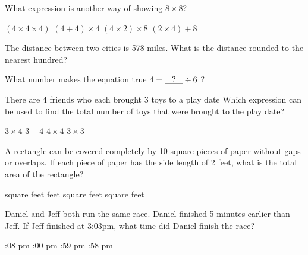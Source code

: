 \documentclass{exam}
\newcommand{\qm}{\underline{\hspace{0.3cm}?\hspace{0.3cm}}}
\begin{document}
\begin{center}
\end{center}

\vspace{0.1in}

\begin{questions}
	\question What expression is another way of showing $8 \times 8$?
	\begin{choices}
		\choice $(4 \times 4 \times 4)$
		\choice $(4+4)\times 4$
		\choice $(4 \times 2) \times 8$
		\choice $(2 \times 4) + 8$
	\end{choices}

	\question The distance between two cities is 578 miles. What is the distance rounded to the nearest hundred?
	\begin{choices}
		\choice 500
		\choice 600
		\choice 580
		\choice 570
	\end{choices}

	\question What number makes the equation true $4 = \qm \div 6$ ?
	\begin{choices}
		\choice 2
		\choice 24
		\choice 12
		\choice 77
	\end{choices}

	\question There are 4 friends who each brought 3 toys to a play date Which expression can be used to find the total number of toys that were brought to the play date?
	\begin{choices}
	\choice $3 \times 4$
	\choice $3 + 4$
	\choice $4 \times 4$ 
	\choice $3 \times 3$
	\end{choices}

	\question  A rectangle can be covered completely by 10 square pieces of paper without gaps or overlaps. If each piece of paper has the side length of 2 feet, what is the total area of the rectangle?
	\begin{choices}
		 square feet
		 feet
		 square feet 
		 square feet
	\end{choices}

	\question Daniel and Jeff both run the same race.  Daniel finished 5 minutes earlier than Jeff. If Jeff finished at 3:03pm, what time did Daniel finish the race?
	\begin{choices}
		:08 pm
		:00 pm
		:59 pm
		:58 pm
	\end{choices}


\end{questions}
\end{document}
